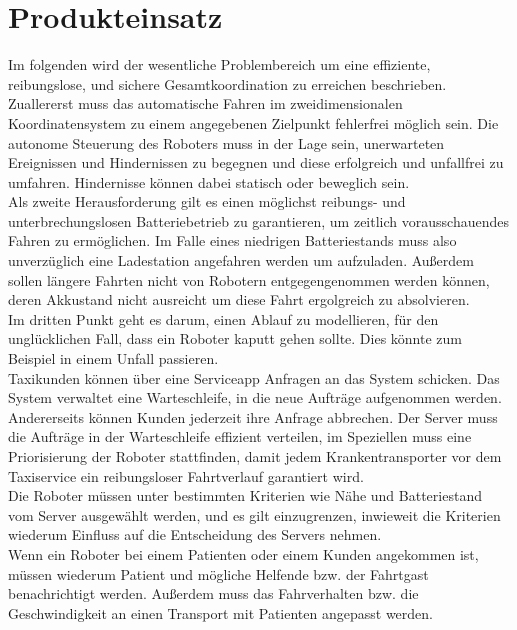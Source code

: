 
	\section{Produkteinsatz}
	Im folgenden wird der wesentliche Problembereich um eine effiziente, reibungslose, und sichere Gesamtkoordination zu erreichen beschrieben.\\

Zuallererst muss das automatische Fahren im zweidimensionalen Koordinatensystem zu einem angegebenen Zielpunkt fehlerfrei möglich sein. 
	Die autonome Steuerung des Roboters muss in der Lage sein, unerwarteten Ereignissen und Hindernissen zu begegnen und diese erfolgreich und unfallfrei zu umfahren. Hindernisse können dabei statisch oder beweglich sein.\\
	
Als zweite Herausforderung gilt es einen möglichst reibungs- und unterbrechungslosen Batteriebetrieb zu garantieren, um zeitlich vorausschauendes Fahren zu ermöglichen. Im Falle eines niedrigen Batteriestands muss also unverzüglich eine Ladestation angefahren werden um aufzuladen. Außerdem sollen längere Fahrten nicht von Robotern entgegengenommen werden können, deren Akkustand nicht ausreicht um diese Fahrt ergolgreich zu absolvieren.\\

Im dritten Punkt geht es darum, einen Ablauf zu modellieren, für den unglücklichen Fall, dass ein Roboter kaputt gehen sollte. Dies könnte zum Beispiel in einem Unfall passieren.\\

Taxikunden können über eine Serviceapp Anfragen an das System schicken. Das System verwaltet eine Warteschleife, in die neue Aufträge aufgenommen werden. Andererseits können Kunden jederzeit ihre Anfrage abbrechen. Der Server muss die Aufträge in der Warteschleife effizient verteilen, im Speziellen muss eine Priorisierung der Roboter stattfinden, damit jedem Krankentransporter vor dem Taxiservice ein reibungsloser Fahrtverlauf garantiert wird.\\

Die Roboter müssen unter bestimmten Kriterien wie Nähe und Batteriestand vom Server ausgewählt werden, und es gilt einzugrenzen, inwieweit die Kriterien wiederum Einfluss auf die Entscheidung des Servers nehmen.\\

Wenn ein Roboter bei einem Patienten oder einem Kunden angekommen ist, müssen wiederum Patient und mögliche Helfende bzw. der Fahrtgast benachrichtigt werden. Außerdem muss das Fahrverhalten bzw. die Geschwindigkeit an einen Transport mit Patienten angepasst werden.\\

